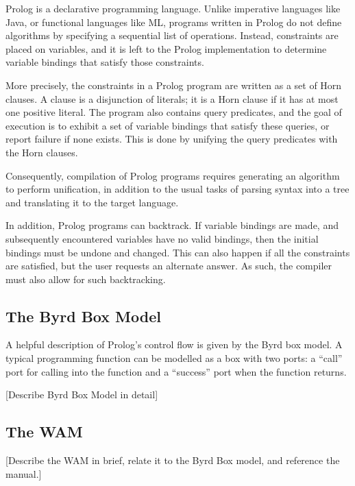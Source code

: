 \documentclass[12pt]{article}
\begin{document}
Prolog is a declarative programming language. 
Unlike imperative languages like Java, or functional languages like ML, programs written in Prolog do not define algorithms by specifying a sequential list of operations. 
Instead, constraints are placed on variables, and it is left to the Prolog implementation to determine variable bindings that satisfy those constraints. 

More precisely, the constraints in a Prolog program are written as a set of Horn clauses. 
A clause is a disjunction of literals; it is a Horn clause if it has at most one positive literal. 
The program also contains query predicates, and the goal of execution is to exhibit a set of variable bindings that satisfy these queries, or report failure if none exists. 
This is done by unifying the query predicates with the Horn clauses.

Consequently, compilation of Prolog programs requires generating an algorithm to perform unification, in addition to the usual tasks of parsing syntax into a tree and translating it to the target language.

In addition, Prolog programs can backtrack. 
If variable bindings are made, and subsequently encountered variables have no valid bindings, then the initial bindings must be undone and changed. 
This can also happen if all the constraints are satisfied, but the user requests an alternate answer. 
As such, the compiler must also allow for such backtracking.

\subsection{The Byrd Box Model}


A helpful description of Prolog's control flow is given by the Byrd box model. 
A typical programming function can be modelled as a box with two ports: a ``call'' port for calling into the function and a ``success'' port when the function returns. 

[Describe Byrd Box Model in detail]

\subsection{The WAM}

[Describe the WAM in brief, relate it to the Byrd Box model, and reference the manual.]
\end{document}
